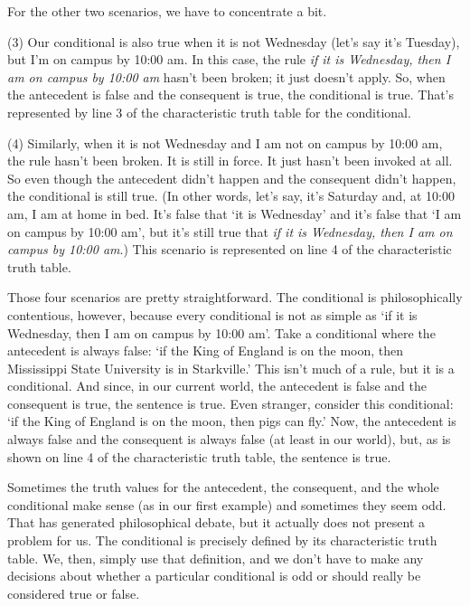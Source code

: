 For the other two scenarios, we have to concentrate a bit. 

\begin{ebullet}	
\item[(3)] Our conditional is also true when it is not Wednesday (let's say it's Tuesday), but I'm on campus by 10:00 am. In this case, the rule \textit{if it is Wednesday, then I am on campus by 10:00 am} hasn't been broken; it just doesn't apply. So, when the antecedent is false and the consequent is true, the conditional is true. That's represented by line 3 of the characteristic truth table for the conditional. 
\item[(4)] Similarly, when it is not Wednesday and I am not on campus by 10:00 am, the rule hasn't been broken. It is still in force. It just hasn't been invoked at all. So even though the antecedent didn't happen and the consequent didn't happen, the conditional is still true. (In other words, let's say, it's Saturday and, at 10:00 am, I am at home in bed. It's false that `it is Wednesday' and it's false that `I am on campus by 10:00 am', but it's still true that \textit{if it is Wednesday, then I am on campus by 10:00 am}.) This scenario is represented on line 4 of the characteristic truth table.
\end{ebullet}

Those four scenarios are pretty straightforward. The conditional is philosophically contentious, however, because every conditional is not as simple as `if it is Wednesday, then I am on campus by 10:00 am'. Take a conditional where the antecedent is always false: `if the King of England is on the moon, then Mississippi State University is in Starkville.' This isn't much of a rule, but it is a conditional. And since, in our current world, the antecedent is false and the consequent is true, the sentence is true. Even stranger, consider this conditional: `if the King of England is on the moon, then pigs can fly.' Now, the antecedent is always false and the consequent is always false (at least in our world), but, as is shown on line 4 of the characteristic truth table, the sentence is true. 

Sometimes the truth values for the antecedent, the consequent, and the whole conditional make sense (as in our first example) and sometimes they seem odd. That has generated philosophical debate, but it actually does not present a problem for us. The conditional is precisely defined by its characteristic truth table. We, then, simply use that definition, and we don't have to make any decisions about whether a particular conditional is odd or should really be considered true or false. 

